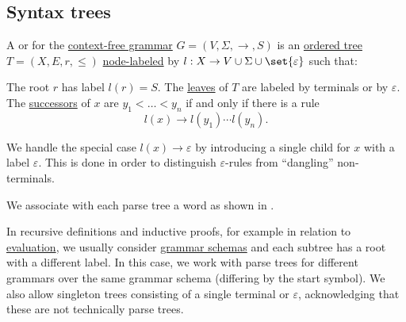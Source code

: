 \subsection{Syntax trees}\label{subsec:syntax_trees}

\begin{definition}\label{def:parse_tree}\mimprovised
  A  or  for the \hyperref[def:chomsky_hierarchy/context_free]{context-free grammar} \( G = (V, \Sigma, \to, S) \) is an \hyperref[def:ordered_tree]{ordered tree} \( T = (X, E, r, \leq) \) \hyperref[def:labeled_set]{node-labeled} by \( l: X \to V \cup \Sigma \cup \set{ \varepsilon } \) such that:
  \begin{thmenum}
     The root \( r \) has label \( l(r) = S \).
     The \hyperref[def:rooted_tree/leaf]{leaves} of \( T \) are labeled by terminals or by \( \varepsilon \).
     The \hyperref[def:rooted_tree/parent_child]{successors} of \( x \) are \( y_1 < \ldots < y_n \) if and only if there is a rule
    \begin{equation*}
      l(x) \to l(y_1) \cdots l(y_n).
    \end{equation*}

    We handle the special case \( l(x) \to \varepsilon \) by introducing a single child for \( x \) with a label \( \varepsilon \). This is done in order to distinguish \( \varepsilon \)-rules from \enquote{dangling} non-terminals.
  \end{thmenum}
\end{definition}
\begin{comments}
  \item We associate with each parse tree a word as shown in .
\end{comments}

\begin{remark}\label{rem:parse_tree_roots}
  In recursive definitions and inductive proofs, for example in relation to \hyperref[rem:evaluation]{evaluation}, we usually consider \hyperref[ex:natural_number_arithmetic_grammar/rules]{grammar schemas} and each subtree has a root with a different label. In this case, we work with parse trees for different grammars over the same grammar schema (differing by the start symbol). We also allow singleton trees consisting of a single terminal or \( \varepsilon \), acknowledging that these are not technically parse trees.
\end{remark}

